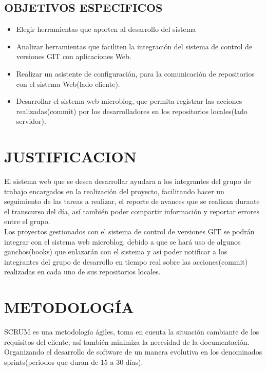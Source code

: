 \subsection{OBJETIVOS ESPECIFICOS}
\begin{itemize}
\item Elegir herramientas que aporten al desarrollo del sistema
\item Analizar herramientas que faciliten la integración del sistema de control 	de versiones GIT con aplicaciones Web.
\item Realizar un asistente de configuración, para la comunicación de 	repositorios con el sistema Web(lado cliente).
\item Desarrollar el sistema web microblog, que permita registrar las acciones realizadas(commit) por los desarrolladores en los repositorios locales(lado servidor).
\end{itemize}

\section{JUSTIFICACION}
El sistema web que se desea desarrollar ayudara  a los integrantes del grupo de trabajo encargados en la realización del proyecto, facilitando hacer un seguimiento de las tareas a realizar, el reporte de avances que se realizan durante el transcurso del día, así también poder compartir información y reportar errores entre el grupo.\\

Los proyectos gestionados con el sistema de control de versiones GIT se podrán integrar con el sistema web microblog, debido a que se hará uso de algunos ganchos(hooks) que enlazarán con el sistema y así poder notificar a los integrantes del grupo de desarrollo en tiempo real sobre las acciones(commit) realizadas en cada uno de sus repositorios locales.

\section{METODOLOGÍA}
SCRUM es una metodología ágiles, toma en cuenta la situación cambiante de los requisitos del cliente, así también minimiza la necesidad de la documentación.
Organizando el desarrollo de software de un manera evolutiva en los denominados sprints(periodos que duran de 15 a 30 días).

